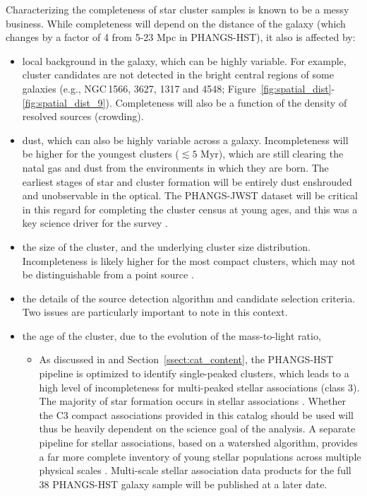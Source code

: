 \documentclass[linenumbers]{aastex63}
\begin{document}
{Characterizing the completeness of star cluster samples is known to be a messy business. While completeness will depend on the distance of the galaxy (which changes by a factor of 4 from 5-23 Mpc in PHANGS-HST), it also is affected by:
\begin{itemize}
    \item local background in the galaxy, which can be highly variable.  For example, cluster candidates are not detected in the bright central regions of some galaxies (e.g., NGC\,1566, 3627, 1317 and 4548; Figure~\ref{fig:spatial_dist}-\ref{fig:spatial_dist_9}). Completeness will also be a function of the density of resolved sources (crowding).
    \item dust, which can also be highly variable across a galaxy.  Incompleteness will be higher for the youngest clusters ($\lesssim5$ Myr), which are still clearing the natal gas and dust from the environments in which they are born.  The earliest stages of star and cluster formation will be entirely dust enshrouded and unobservable in the optical.   The PHANGS-JWST dataset will be critical in this regard for completing the cluster census at young ages, and this was a key science driver for the survey \citep[][and references therein]{lee_phangs-jwst_2023}.
    \item the size of the cluster, and the underlying cluster size distribution.  Incompleteness is likely higher for the most compact clusters, which may not be distinguishable from a point source \citep[e.g.,][]{ryon_effective_2017, brown_radii_2021}.  
    \item the details of the source detection algorithm and candidate selection criteria.  Two issues are particularly important to note in this context.
    \item the age of the cluster, due to the evolution of the mass-to-light ratio,
    \begin{itemize}
    \item As discussed in \citet{lee_phangs-hst_2022} and Section~\ref{ssect:cat_content}, the PHANGS-HST pipeline is optimized to identify single-peaked clusters, which leads to a high level of incompleteness for multi-peaked stellar associations (class 3).  The majority of star formation occurs in stellar associations \citep[][and references therein]{lada03,ward18, ward20, wright20}.  Whether the C3 compact associations provided in this catalog should be used will thus be heavily dependent on the science goal of the analysis. A separate pipeline for stellar associations, based on a watershed algorithm, provides a far more complete inventory of young stellar populations across multiple physical scales \citep{larson_multi-scale_2022}. Multi-scale stellar association data products for the full 38 PHANGS-HST galaxy sample will be published at a later date.  

\end{itemize}
\end{itemize}}
\end{document}

